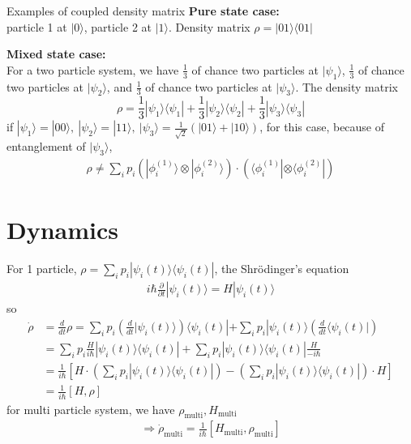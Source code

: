 \documentclass[UTF8,12pt]{article} %
\numberwithin{equation}{section}
\begin{document}
\begin{myboxes}{Examples of coupled density matrix}{}
\textbf{Pure state case:}\\particle 1 at $|0\rangle$, particle 2 at $|1\rangle$. Density matrix $\rho = |01\rangle\langle 01|$\\\par
\textbf{Mixed state case:}\\For a two particle system, we have $\frac{1}{3}$ of chance two particles at $|\psi_{1}\rangle$, $\frac{1}{3}$ of chance two particles at $|\psi_{2}\rangle$, and $\frac{1}{3}$ of chance two particles at $|\psi_{3}\rangle$. The density matrix
$$\rho = \frac{1}{3}|\psi_{1}\rangle\langle\psi_{1}| + \frac{1}{3}|\psi_{2}\rangle\langle\psi_{2}| + \frac{1}{3}|\psi_{3}\rangle\langle\psi_{3}|$$
if $|\psi_{1}\rangle = |00\rangle,~ |\psi_{2}\rangle = |11\rangle,~ |\psi_{3}\rangle = \frac{1}{\sqrt{2}}(|01\rangle + |10\rangle)$, for this case, because of entanglement of $|\psi_{3}\rangle$,
\begin{align}
\rho \ne \sum_{i} p_{i}\left(|\phi_{i}^{(1)}\rangle \otimes |\phi_{i}^{(2)}\rangle\right) \cdot \left(\langle\phi_{i}^{(1)}|\otimes\langle\phi_{i}^{(2)}|\right)
\end{align}
\end{myboxes}

\section{Dynamics}

For 1 particle, $\rho = \sum_{i} p_{i} |\psi_{i}(t)\rangle\langle\psi_{i}(t)|$, the Shr\"{o}dinger's equation
\begin{align}
i\hbar\frac{\partial}{\partial t}|\psi_{i}(t)\rangle = H|\psi_{i}(t)\rangle
\end{align}
so
\begin{align}
\dot{\rho} &= \frac{d}{dt} \rho = \sum_{i} p_{i}\left(\frac{d}{dt}|\psi_{i}(t)\rangle\right)\langle\psi_{i}(t)| + \sum_{i}p_{i}|\psi_{i}(t)\rangle \left(\frac{d}{dt}\langle\psi_{i}(t)|\right) \\
&= \sum_{i}p_{i}\frac{H}{i\hbar} |\psi_{i}(t)\rangle\langle\psi_{i}(t)| + \sum_{i}p_{i}|\psi_{i}(t)\rangle\langle\psi_{i}(t)|\frac{H}{-i\hbar} \\
&= \frac{1}{i\hbar} \left[H \cdot \left(\sum_{i}p_{i}|\psi_{i}(t)\rangle\langle\psi_{i}(t)|\right) - \left(\sum_{i}p_{i}|\psi_{i}(t)\rangle\langle\psi_{i}(t)|\right)\cdot H\right] \\
&= \frac{1}{i\hbar} [H,\rho]
\end{align}
for multi particle system, we have $\rho_{\text{multi}}, H_{\text{multi}}$
\begin{align}
\Rightarrow \dot{\rho}_{\text{multi}} = \frac{1}{i\hbar}[H_{\text{multi}},\rho_{\text{multi}}]
\end{align}
\end{document}
